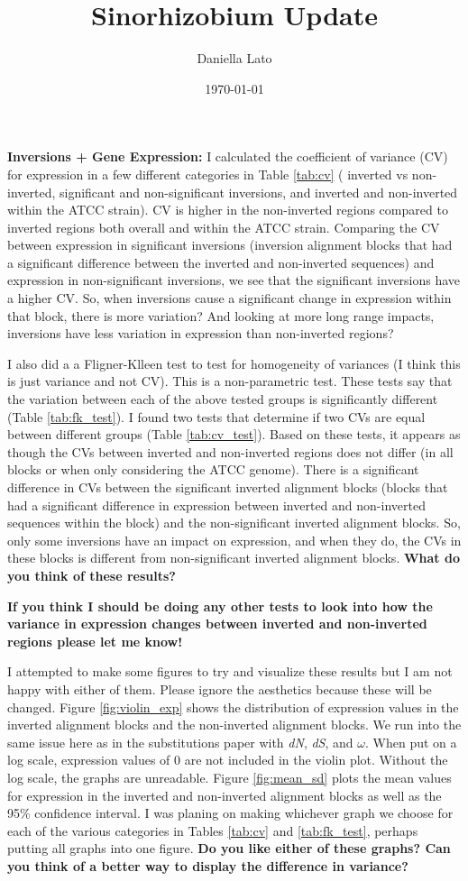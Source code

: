 \documentclass[12pt]{article}
\title{Sinorhizobium Update}
\author{Daniella Lato}
\date{\today}
\newcommand{\dn}{\textit{dN}\xspace}
\newcommand{\ds}{\textit{dS}\xspace}
\begin{document}
\textbf{Inversions + Gene Expression:}
I calculated the coefficient of variance (CV) for expression in a few different categories in Table \ref{tab:cv} ( inverted vs non-inverted, significant and non-significant inversions, and inverted and non-inverted within the ATCC strain).
CV is higher in the non-inverted regions compared to inverted regions both overall and within the ATCC strain.
Comparing the CV between expression in significant inversions (inversion alignment blocks that had a significant difference between the inverted and non-inverted sequences) and expression in non-significant inversions, we see that the significant inversions have a higher CV.
So, when inversions cause a significant change in expression within that block, there is more variation?
And looking at more long range impacts, inversions have less variation in expression than non-inverted regions?

I also did a a Fligner-Klleen test to test for homogeneity of variances (I think this is just variance and not CV). This is a non-parametric test.
These tests say that the variation between each of the above tested groups is significantly different (Table \ref{tab:fk_test}).
I found two tests that determine if two CVs are equal between different groups (Table \ref{tab:cv_test}).
Based on these tests, it appears as though the CVs between inverted and non-inverted regions does not differ (in all blocks or when only considering the ATCC genome).
There is a significant difference in CVs between the significant inverted alignment blocks (blocks that had a significant difference in expression between inverted and non-inverted sequences within the block) and the non-significant inverted alignment blocks.
So, only some inversions have an impact on expression, and when they do, the CVs in these blocks is different from non-significant inverted alignment blocks.
\textbf{What do you think of these results?}

\textbf{If you think I should be doing any other tests to look into how the variance in expression changes between inverted and non-inverted regions please let me know!}

I attempted to make some figures to try and visualize these results but I am not happy with either of them.
Please ignore the aesthetics because these will be changed.
Figure \ref{fig:violin_exp} shows the distribution of expression values in the inverted alignment blocks and the non-inverted alignment blocks.
We run into the same issue here as in the substitutions paper with \dn, \ds, and $\omega$. 
When put on a log scale, expression values of 0 are not included in the violin plot.
Without the log scale, the graphs are unreadable.
Figure \ref{fig:mean_sd} plots the mean values for expression in the inverted and non-inverted alignment blocks as well as the 95\% confidence interval. 
I was planing on making whichever graph we choose for each of the various categories in Tables \ref{tab:cv} and \ref{tab:fk_test}, perhaps putting all graphs into one figure.
\textbf{Do you like either of these graphs? Can you think of a better way to display the difference in variance?}
\end{document}

